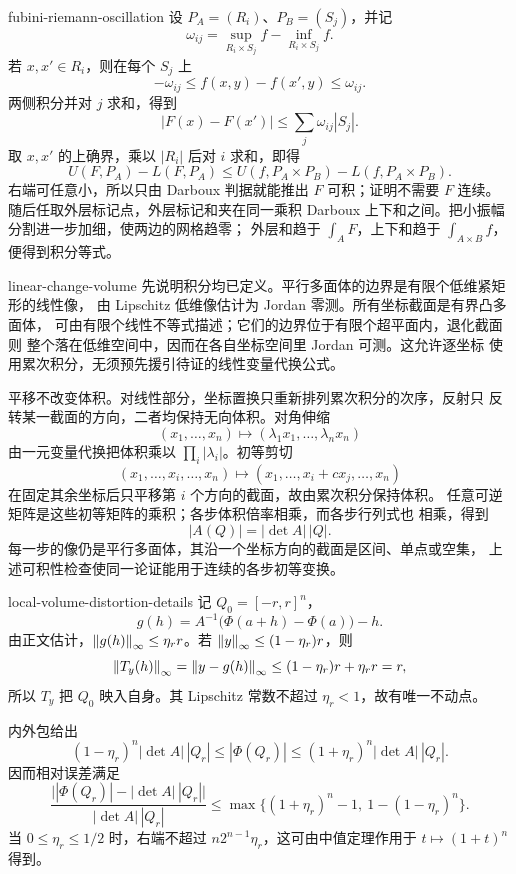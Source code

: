 \begin{solution}{fubini-riemann-oscillation}
设 \(P_A=(R_i)\)、\(P_B=(S_j)\)，并记
\[
 \omega_{ij}
 =\sup_{R_i\times S_j}f-\inf_{R_i\times S_j}f.
\]
若 \(x,x'\in R_i\)，则在每个 \(S_j\) 上
\[
 -\omega_{ij}\le f(x,y)-f(x',y)\le\omega_{ij}.
\]
两侧积分并对 \(j\) 求和，得到
\[
 |F(x)-F(x')|\le\sum_j\omega_{ij}|S_j|.
\]
取 \(x,x'\) 的上确界，乘以 \(|R_i|\) 后对 \(i\) 求和，即得
\[
 U(F,P_A)-L(F,P_A)
 \le U(f,P_A\times P_B)-L(f,P_A\times P_B).
\]
右端可任意小，所以只由 Darboux 判据就能推出 \(F\) 可积；证明不需要
\(F\) 连续。随后任取外层标记点，外层标记和夹在同一乘积
Darboux 上下和之间。把小振幅分割进一步加细，使两边的网格趋零；
外层和趋于 $\int_AF$，上下和趋于 $\int_{A\times B}f$，便得到积分等式。
\end{solution}

\begin{solution}{linear-change-volume}
先说明积分均已定义。平行多面体的边界是有限个低维紧矩形的线性像，
由 Lipschitz 低维像估计为 Jordan 零测。所有坐标截面是有界凸多面体，
可由有限个线性不等式描述；它们的边界位于有限个超平面内，退化截面则
整个落在低维空间中，因而在各自坐标空间里 Jordan 可测。这允许逐坐标
使用累次积分，无须预先援引待证的线性变量代换公式。

平移不改变体积。对线性部分，坐标置换只重新排列累次积分的次序，反射只
反转某一截面的方向，二者均保持无向体积。对角伸缩
\[
 (x_1,\ldots,x_n)\longmapsto
 (\lambda_1x_1,\ldots,\lambda_nx_n)
\]
由一元变量代换把体积乘以 \(\prod_i|\lambda_i|\)。初等剪切
\[
 (x_1,\ldots,x_i,\ldots,x_n)
 \longmapsto
 (x_1,\ldots,x_i+c x_j,\ldots,x_n)
\]
在固定其余坐标后只平移第 \(i\) 个方向的截面，故由累次积分保持体积。
任意可逆矩阵是这些初等矩阵的乘积；各步体积倍率相乘，而各步行列式也
相乘，得到
\[
 |A(Q)|=|\det A|\,|Q|.
\]
每一步的像仍是平行多面体，其沿一个坐标方向的截面是区间、单点或空集，
上述可积性检查使同一论证能用于连续的各步初等变换。
\end{solution}

\begin{solution}{local-volume-distortion-details}
记 \(Q_0=[-r,r]^n\)，
\[
 g(h)=A^{-1}\bigl(\Phi(a+h)-\Phi(a)\bigr)-h.
\]
由正文估计，\(\left\lVert g(h)\right\rVert_\infty\le\eta_rr\)。若
\(\left\lVert y\right\rVert_\infty\le(1-\eta_r)r\)，则
\[
 \left\lVert T_y(h)\right\rVert_\infty
 =\left\lVert y-g(h)\right\rVert_\infty
 \le(1-\eta_r)r+\eta_rr=r,
\]
所以 \(T_y\) 把 \(Q_0\) 映入自身。其 Lipschitz 常数不超过
\(\eta_r<1\)，故有唯一不动点。

内外包给出
\[
 (1-\eta_r)^n|\det A|\,|Q_r|
 \le|\Phi(Q_r)|
 \le(1+\eta_r)^n|\det A|\,|Q_r|.
\]
因而相对误差满足
\[
 \frac{\bigl||\Phi(Q_r)|-|\det A|\,|Q_r|\bigr|}
      {|\det A|\,|Q_r|}
 \le
 \max\{(1+\eta_r)^n-1,\ 1-(1-\eta_r)^n\}.
\]
当 \(0\le\eta_r\le1/2\) 时，右端不超过
\(n2^{n-1}\eta_r\)，这可由中值定理作用于 \(t\mapsto(1+t)^n\) 得到。
\end{solution}

